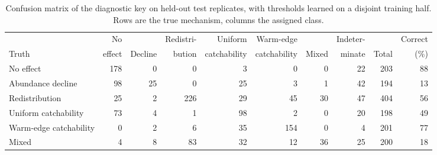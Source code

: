 \documentclass[11pt,a4paper]{article}
\begin{document}
\begin{table}[htbp]
\centering\scriptsize\setlength{\tabcolsep}{3.5pt}
\caption{Confusion matrix of the diagnostic key on held-out test replicates, with thresholds learned on a disjoint training half. Rows are the true mechanism, columns the assigned class.}
\label{tab:key}
\begin{tabular}{@{}lrrrrrrrrr@{}}
\toprule
& No & & Redistri- & Uniform & Warm-edge & & Indeter- & & Correct \\
Truth & effect & Decline & bution & catchability & catchability & Mixed & minate & Total & (\%) \\
\midrule
No effect & 178 &  0 &   0 &  3 &   0 &  0 & 22 & 203 & 88 \\
Abundance decline &  98 & 25 &   0 & 25 &   3 &  1 & 42 & 194 & 13 \\
Redistribution &  25 &  2 & 226 & 29 &  45 & 30 & 47 & 404 & 56 \\
Uniform catchability &  73 &  4 &   1 & 98 &   2 &  0 & 20 & 198 & 49 \\
Warm-edge catchability &   0 &  2 &   6 & 35 & 154 &  0 &  4 & 201 & 77 \\
Mixed &   4 &  8 &  83 & 32 &  12 & 36 & 25 & 200 & 18 \\
\bottomrule
\end{tabular}
\end{table}
\end{document}
